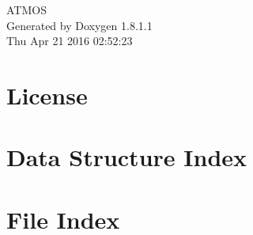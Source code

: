 \documentclass{book}
\begin{document}
\hypersetup{pageanchor=false,citecolor=blue}
\begin{titlepage}
\vspace*{7cm}
\begin{center}
{\Large A\-T\-M\-O\-S }\\
\vspace*{1cm}
{\large Generated by Doxygen 1.8.1.1}\\
\vspace*{0.5cm}
{\small Thu Apr 21 2016 02:52:23}\\
\end{center}
\end{titlepage}
\clearemptydoublepage
{}
\tableofcontents
\clearemptydoublepage
{}
\hypersetup{pageanchor=true,citecolor=blue}
\chapter{License}
\label{License}
\hypertarget{License}{}

\chapter{Data Structure Index}

\chapter{File Index}

\end{document}
